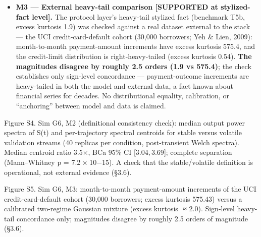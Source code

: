 \documentclass[
]{article}
\begin{document}
\begin{itemize}
  the spectral variable --- see the valence boundary, §7),
  ensemble-averaged signals (averaging is itself a low-pass filter --- a
  measurement error), and white-noise matched validation (flat residual
  spectra; conditions differed in power, not shape) --- are preserved in
  §S. The surviving claim is the theory's own: what distinguishes a
  stable trust environment is that expectation can be about it.
\item
  \textbf{M3 --- External heavy-tail comparison {[}SUPPORTED at
  stylized-fact level{]}.} The protocol layer's heavy-tail stylized fact
  (benchmark T5b, excess kurtosis 1.9) was checked against a real
  dataset external to the stack --- the UCI credit-card-default cohort
  (30,000 borrowers; Yeh \& Lien, 2009): month-to-month payment-amount
  increments have excess kurtosis 575.4, and the credit-limit
  distribution is right-heavy-tailed (excess kurtosis 0.54). \textbf{The
  magnitudes disagree by roughly 2.5 orders (1.9 vs 575.4)}; the check
  establishes only sign-level concordance --- payment-outcome increments
  are heavy-tailed in both the model and external data, a fact known
  about financial series for decades. No distributional equality,
  calibration, or ``anchoring'' between model and data is claimed.
\end{itemize}

Figure S4. Sim G6, M2 (definitional consistency check): median output
power spectra of {S(t)} and per-trajectory spectral centroids for stable
versus volatile validation streams (40 replicas per condition,
post-transient Welch spectra). Median centroid ratio {3.5×}, BCa 95\% CI
{{[}3.04, 3.69{]}}; complete separation (Mann--Whitney
{p = 7.2 × 10−15}). A check that the stable/volatile definition is
operational, not external evidence (§3.6).

Figure S5. Sim G6, M3: month-to-month payment-amount increments of the
UCI credit-card-default cohort (30,000 borrowers; excess kurtosis
575.43) versus a calibrated two-regime Gaussian mixture (excess kurtosis
{ ≈ 2.0}). Sign-level heavy-tail concordance only; magnitudes disagree
by roughly 2.5 orders of magnitude (§3.6).
\end{document}
